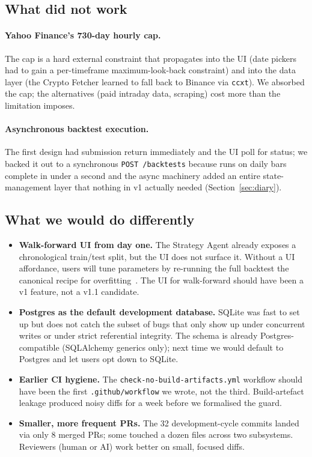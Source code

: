 \subsection{What did not work}

\paragraph{Yahoo Finance's 730-day hourly cap.} The cap is a hard external
constraint that propagates into the UI (date pickers had to gain a per-timeframe
maximum-look-back constraint) and into the data layer (the Crypto Fetcher learned
to fall back to Binance via \texttt{ccxt}). We absorbed the cap; the alternatives
(paid intraday data, scraping) cost more than the limitation imposes.

\paragraph{Asynchronous backtest execution.} The first design had submission
return immediately and the UI poll for status; we backed it out to a synchronous
\texttt{POST /backtests} because runs on daily bars complete in under a second
and the async machinery added an entire state-management layer that nothing in
v1 actually needed (Section~\ref{sec:diary}).

\subsection{What we would do differently}

\begin{itemize}
  \item \textbf{Walk-forward UI from day one.} The Strategy Agent already exposes a
        chronological train/test split, but the UI does not surface it. Without a UI
        affordance, users will tune parameters by re-running the full backtest
        \textemdash{} the canonical recipe for overfitting~\cite{bailey2014}. The
        UI for walk-forward should have been a v1 feature, not a v1.1 candidate.
  \item \textbf{Postgres as the default development database.} SQLite was fast to set
        up but does not catch the subset of bugs that only show up under concurrent
        writes or under strict referential integrity. The schema is already
        Postgres-compatible (SQLAlchemy generics only); next time we would default
        to Postgres and let users opt down to SQLite.
  \item \textbf{Earlier CI hygiene.} The \texttt{check-no-build-artifacts.yml}
        workflow should have been the first \texttt{.github/workflow} we wrote, not
        the third. Build-artefact leakage produced noisy diffs for a week before we
        formalised the guard.
  \item \textbf{Smaller, more frequent PRs.} The 32 development-cycle commits landed
        via only 8 merged PRs; some touched a dozen files across two subsystems.
        Reviewers (human or AI) work better on small, focused diffs.
\end{itemize}

